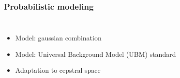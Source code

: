 \documentclass[11pt,english]{beamer}
\begin{document}
\begin{frame}
  \frametitle{Probabilistic modeling}
  \begin{columns}
    \begin{itemize}
    \item Model: gaussian combination
    \item Model: Universal Background Model (UBM) standard
    \item<2> Adaptation to cepstral space
    \end{itemize}
  \end{columns}
  \begin{itemize}
  

\end{itemize}
\end{frame}
\end{document}
